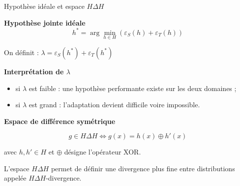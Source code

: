 \documentclass[11pt]{beamer}
\begin{document}
\begin{frame}{Hypothèse idéale et espace $H\Delta H$}

\textbf{Hypothèse jointe idéale}
\vspace{0.1cm}
\[
h^*
=
\arg\min_{h \in H}
\left(
\varepsilon_S(h)+\varepsilon_T(h)
\right)
\]

\vspace{0.1cm}

On définit : $
\lambda
=
\varepsilon_S(h^*)
+
\varepsilon_T(h^*)$

\vspace{0.1cm}

\textbf{Interprétation de $\lambda$}

\begin{itemize}
    \item si $\lambda$ est faible :
    une hypothèse performante existe sur les deux domaines ;
    
    \item si $\lambda$ est grand :
    l’adaptation devient difficile voire impossible.
\end{itemize}

\vspace{0.4cm}

\textbf{Espace de différence symétrique}

\[
g \in H\Delta H
\iff
g(x)=h(x)\oplus h'(x)
\]

avec $h,h' \in H$ et $\oplus$ désigne l’opérateur XOR.

\vspace{0.2cm}

L'espace $H\Delta H$ permet de définir une divergence plus fine entre distributions appelée $H\Delta H$-divergence.

\end{frame}
\end{document}
